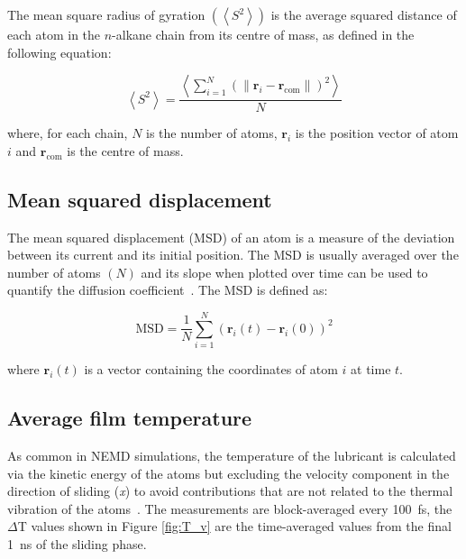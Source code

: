 \documentclass[5p]{elsarticle}
\begin{document}
The mean square radius of gyration $\left(\left< S^2 \right>\right)$  is the average squared distance of each atom in the $n$-alkane chain  from its centre of mass, as defined in the following equation\cite{Brown1994}:

\begin{equation}
	\left< S^2 \right> = \frac{\left< \sum_{i=1}^{N}  \left ( \lVert \mathbf{r}_i - \mathbf{r}_{\text{com}} \rVert \right)^2 \right>}{N}
\end{equation}

\noindent where, for each chain,  $N$ is the number of atoms, $ \mathbf{r}_i$ is the position vector of atom $i$  and $\mathbf{r}_{\text{com}}$ is the centre of mass. 


\subsection{Mean squared displacement}

The mean squared displacement (MSD) of an atom  is a measure of the deviation between its current and its initial position. The MSD is usually averaged over the number of atoms  $\left(N\right)$ and its slope when plotted over time can be used to quantify the diffusion coefficient~\cite{Auhl2003}. The MSD is defined as:

\begin{equation}
	\text{MSD} = \frac{1}{N}\sum_{i=1}^{N} \left( \mathbf{r}_i\left(t\right)-\mathbf{r}_i\left(0\right)\right)^2
\end{equation}

\noindent where   $\mathbf{r}_i\left(t\right)$ is a vector containing the coordinates of atom $i$ at time $t$.


\subsection{Average film temperature}

As common in NEMD simulations, the temperature of the lubricant is calculated via the kinetic energy of the atoms but excluding the velocity component in the direction of sliding (\emph{x}) to avoid contributions that are not related to the thermal vibration of the atoms~\cite{Gattinoni2013}. The measurements are block-averaged every \SI{100}{\femto\second}, the $\Delta$T values shown in Figure \ref{fig:T_v} are the time-averaged values from the final \SI{1}{\nano\second} of the sliding phase.
\end{document}
